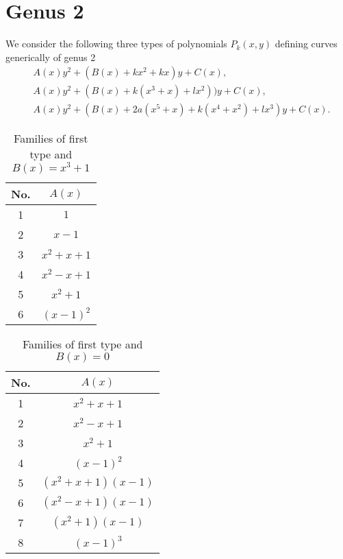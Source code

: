 \documentclass{amsart}
\begin{document}
\section{Genus 2}
We consider the following three types of polynomials $P_k(x,y)$ defining curves generically of genus 2
\begin{align*}
&A(x)y^2+(B(x)+kx^2+kx)y+C(x),\\
&A(x)y^2+(B(x)+k(x^3+x)+lx^2))y+C(x),\\
&A(x)y^2+(B(x)+2a(x^5+x)+k(x^4+x^2)+lx^3)y+C(x).
\end{align*}

\begin{table}[ht]
\caption{Families of first type and $B(x)=x^3+1$}
\centering
\begin{tabular}{|c |c |}
\hline
No. & $A(x)$  \\
\hline
1 & $1$ \\
2 & $x-1$ \\
3 & $x^2+x+1$ \\
4 & $x^2-x+1$ \\
5 & $x^2+1$ \\
6 & $(x-1)^2$ \\
\hline
\end{tabular}
\end{table}

\begin{table}[ht]
\caption{Families of first type and $B(x)=0$}
\centering
\begin{tabular}{|c |c |}
\hline
No. & $A(x)$  \\
\hline
1 & $x^2+x+1$ \\
2 & $x^2-x+1$ \\
3 & $x^2+1$ \\
4 & $(x-1)^2$ \\
5 & $(x^2+x+1)(x-1)$ \\
6 & $(x^2-x+1)(x-1)$ \\
7 & $(x^2+1)(x-1)$ \\
8 & $(x-1)^3$ \\
\hline
\end{tabular}
\end{table}
\end{document}
